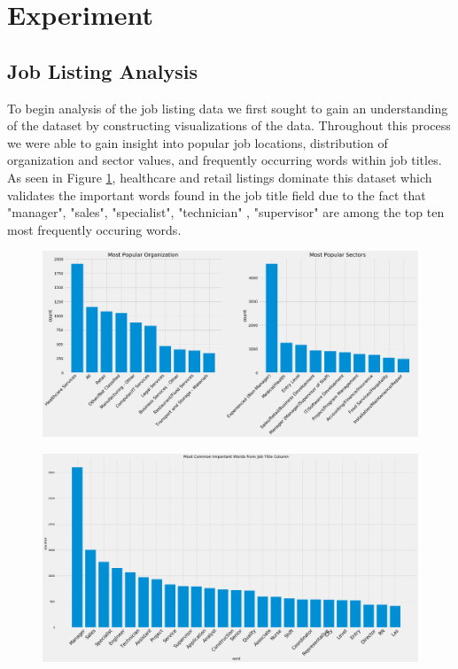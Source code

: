 \section{Experiment}
\subsection{Job Listing Analysis}
To begin analysis of the job listing data we first sought to gain an understanding of the dataset by constructing visualizations of the data. Throughout this process we were able to gain insight into popular job locations, distribution of organization and sector values, and frequently occurring words within job titles.  As seen in Figure \ref{fig:test1}, healthcare and retail listings dominate this dataset which validates the important words found in the job title field due to the fact that "manager", "sales", "specialist", "technician" , "supervisor" are among the top ten most frequently occuring words. \\
\begin{figure} 
	  \includegraphics[width=\textwidth]{images/listings_freq.png}
	\label{fig:test1}
\end{figure}
\begin{figure} 
	  \includegraphics[width=\textwidth]{images/listing_title.png}
	\label{fig:test2}
\end{figure}



